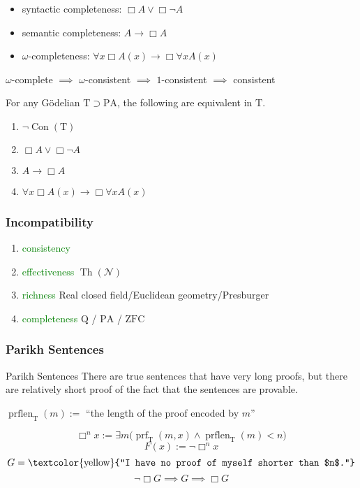 \documentclass[UTF8,aspectratio=43,11pt,colorlinks,compress,openany]{beamer}%
\begin{document}
\begin{frame}\frametitle{}
	\begin{itemize}
		\item syntactic completeness: $\Box A\vee\Box \neg A$
		\item semantic completeness: $A\to\Box A$
		\item $\omega$-completeness: $\forall x\Box A(x)\to\Box \forall x A(x)$
	\end{itemize}
	\begin{center}
		$\omega$-complete $\implies$ $\omega$-consistent $\implies$ $1$-consistent $\implies$ consistent
	\end{center}
	\begin{theorem}
		For any G\"odelian $\mathrm{T}\supset \mathrm{PA} $, the following are equivalent in $\mathrm{T}$.
		\begin{enumerate}
			\item $\neg\operatorname{Con}(\mathrm{T})$
			\item $\Box A\vee\Box \neg A$
			\item $A\to\Box A$
			\item $\forall x\Box A(x)\to\Box \forall x A(x)$
		\end{enumerate}
	\end{theorem}
\end{frame}

\begin{frame}\frametitle{Incompatibility}
\begin{block}{}
			\begin{enumerate}
				\item \textcolor{green}{consistency}
				\item \textcolor{green}{effectiveness} $\operatorname{Th}(\mathcal{N})$
				\item \textcolor{green}{richness} Real closed field/Euclidean geometry/Presburger
				\item \textcolor{green}{completeness} $\mathrm{Q}$ / $\mathrm{PA}$ / $\mathrm{ZFC}$
			\end{enumerate}
\end{block}
\end{frame}

\begin{frame}\frametitle{Parikh Sentences}
	\begin{block}{Parikh Sentences}
		There are true sentences that have very long proofs, but there are relatively short proof of the fact that the sentences are provable.
		\begin{center}
			$\operatorname{prflen}_{\mathrm{T}}(m):=$ ``the length of the proof encoded by $m$''
		\end{center}
		\[\Box ^n x:=\exists m\big(\operatorname{prf}_{\mathrm{T}}(m,x)\wedge\operatorname{prflen}_{\mathrm{T}}(m)<n\big)\]
		\[F(x):=\neg\Box ^n x\]
		\[G=\text{\textcolor{yellow}{``I have no proof of myself shorter than $n$.''}}\]		
		\[\neg\Box G\implies G\implies\Box G\]
	\end{block}
\end{frame}
\end{document}
